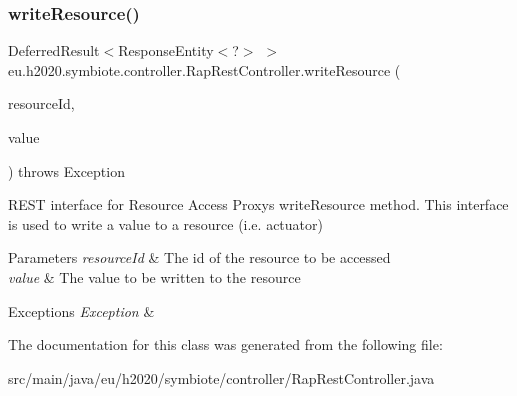 \subsubsection{\texorpdfstring{write\+Resource()}{writeResource()}}
{\footnotesize\ttfamily Deferred\+Result$<$Response\+Entity$<$?$>$ $>$ eu.\+h2020.\+symbiote.\+controller.\+Rap\+Rest\+Controller.\+write\+Resource (\begin{DoxyParamCaption}\item[{@Path\+Variable String}]{resource\+Id,  }\item[{@Request\+Body String}]{value }\end{DoxyParamCaption}) throws Exception}

R\+E\+ST interface for Resource Access Proxy\textquotesingle{}s write\+Resource method. This interface is used to write a value to a resource (i.\+e. actuator)


\begin{DoxyParams}{Parameters}
{\em resource\+Id} & The id of the resource to be accessed \\
\hline
{\em value} & The value to be written to the resource \\
\hline
\end{DoxyParams}

\begin{DoxyExceptions}{Exceptions}
{\em Exception} & \\
\hline
\end{DoxyExceptions}


The documentation for this class was generated from the following file\+:\begin{DoxyCompactItemize}
\item 
src/main/java/eu/h2020/symbiote/controller/Rap\+Rest\+Controller.\+java\end{DoxyCompactItemize}
